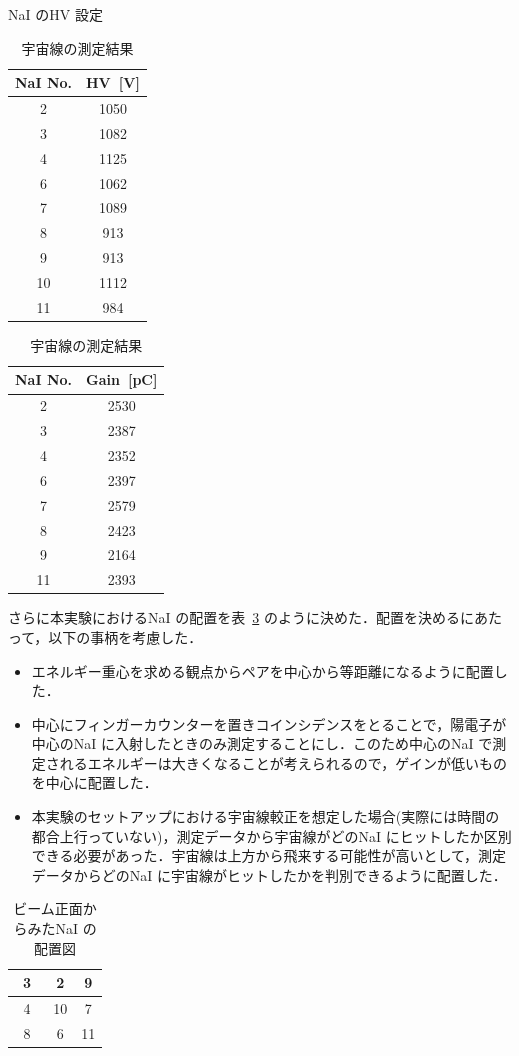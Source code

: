 \begin{table}[H]
\begin{minipage}[t]{0.45\textwidth}
\centering
\caption{NaI のHV 設定}\label{HV}
\begin{tabular}{cc}\toprule
NaI No. & HV~[V]\\ \midrule
2 & 1050 \\
3 & 1082 \\
4 & 1125 \\
6 & 1062 \\
7 & 1089 \\
8 & 913 \\
9 & 913 \\ 
10 & 1112 \\
11 & 984 \\ \bottomrule
\end{tabular}
\end{minipage}
\hfill
\begin{minipage}[t]{0.45\textwidth}
\centering
\caption{宇宙線の測定結果}\label{nai_gain}
\begin{tabular}{cc}\toprule
NaI No. & Gain~[pC]\\ \midrule
2 & 2530 \\
3 & 2387 \\
4 & 2352 \\
6 & 2397 \\
7 & 2579 \\
8 & 2423 \\
9 & 2164 \\
11 &2393 \\ \bottomrule
\end{tabular}
\end{minipage}
\end{table}

さらに本実験におけるNaI の配置を表~\ref{haichi} のように決めた．配置を決めるにあたって，以下の事柄を考慮した．
\begin{itemize}
\item エネルギー重心を求める観点からペアを中心から等距離になるように配置した．
\item 中心にフィンガーカウンターを置きコインシデンスをとることで，陽電子が中心のNaI に入射したときのみ測定することにし．このため中心のNaI で測定されるエネルギーは大きくなることが考えられるので，ゲインが低いものを中心に配置した．
\item 本実験のセットアップにおける宇宙線較正を想定した場合(実際には時間の都合上行っていない)，測定データから宇宙線がどのNaI にヒットしたか区別できる必要があった．宇宙線は上方から飛来する可能性が高いとして，測定データからどのNaI に宇宙線がヒットしたかを判別できるように配置した．
\end{itemize}
\begin{table}[H]
\centering
\caption{ビーム正面からみたNaI の配置図}\label{haichi}
\begin{tabular}{|c|c|c|}\hline
\cellcolor{yellow}~3~ & \cellcolor{red}2 & \cellcolor{yellow}9\\ \hline
\cellcolor{cyan}~4~ & 10 & \cellcolor{red}7\\ \hline
\cellcolor{green}~8~ & \cellcolor{cyan}6 & \cellcolor{green}11\\ \hline
\end{tabular}
\end{table}

